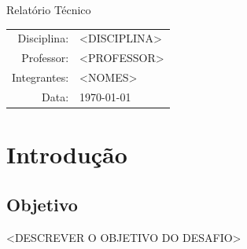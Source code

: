 \pagestyle{fancy}
\fancyhf{}

\fancyfoot[C]{\thepage}

\renewcommand{\headrulewidth}{0.4pt}




\begin{titlepage}

\centering

\vspace*{2cm}

{\Huge\bfseries <NOME DO CTF>\par}

\vspace{0.7cm}

{\Large Relatório Técnico}

\vspace{2cm}

\begin{tabular}{rl}
Disciplina:& <DISCIPLINA>\\
Professor:& <PROFESSOR>\\
Integrantes:& <NOMES>\\
Data:& \today
\end{tabular}

\vfill

\end{titlepage}

\tableofcontents

\newpage


\section{Introdução}

\subsection{Objetivo}

<DESCREVER O OBJETIVO DO DESAFIO>

\vspace{1em}

